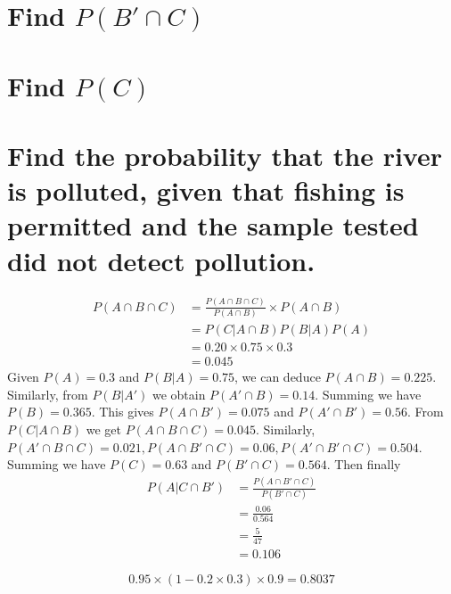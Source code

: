 \documentclass[answers]{exam}
\begin{document}
\begin{questions}
\begin{parts}
\part{Find $P(B'\cap C)$}
\part{Find $P(C)$}
\part{Find the probability that the river is polluted, given that fishing is permitted and the sample tested did not detect pollution.}
\end{parts}

\begin{solution}
	\begin{align*}
		P(A\cap B\cap C) &= \frac{P(A\cap B\cap C)}{P(A\cap B)}\times P(A\cap B) \\
				 &= P(C|A\cap B)P(B|A)P(A) \\
				 &= 0.20\times0.75\times0.3 \\
				 &= 0.045
	\end{align*}
	Given $P(A) = 0.3$ and $P(B|A) = 0.75$, we can deduce $P(A\cap B) = 0.225$. Similarly, from $P(B|A')$ we obtain $P(A'\cap B) = 0.14$. Summing we have $P(B) = 0.365$. This gives $P(A\cap B') = 0.075$ and $P(A'\cap B') = 0.56$. From $P(C|A\cap B)$ we get $P(A\cap B\cap C) = 0.045$. Similarly, $P(A'\cap B\cap C) = 0.021, P(A\cap B'\cap C) = 0.06, P(A'\cap B'\cap C) = 0.504$. Summing we have $P(C) = 0.63$ and $P(B'\cap C) = 0.564$. Then finally
	\begin{align*}
		P(A|C\cap B') &= \frac{P(A\cap B'\cap C)}{P(B'\cap C)} \\
			      &= \frac{0.06}{0.564} \\
			      &= \frac{5}{47} \\
			      &= 0.106
	\end{align*}
\end{solution}


\begin{solution}
	$$0.95\times(1-0.2\times0.3)\times0.9 = 0.8037$$
\end{solution}



\end{questions}
\end{document}
